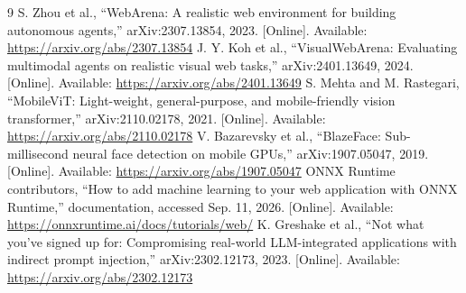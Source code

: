 \documentclass[conference]{IEEEtran}
\begin{document}
\begin{thebibliography}{9}
 S. Zhou et al., ``WebArena: A realistic web environment for building autonomous agents,'' arXiv:2307.13854, 2023. [Online]. Available: \url{https://arxiv.org/abs/2307.13854}
 J. Y. Koh et al., ``VisualWebArena: Evaluating multimodal agents on realistic visual web tasks,'' arXiv:2401.13649, 2024. [Online]. Available: \url{https://arxiv.org/abs/2401.13649}
 S. Mehta and M. Rastegari, ``MobileViT: Light-weight, general-purpose, and mobile-friendly vision transformer,'' arXiv:2110.02178, 2021. [Online]. Available: \url{https://arxiv.org/abs/2110.02178}
 V. Bazarevsky et al., ``BlazeFace: Sub-millisecond neural face detection on mobile GPUs,'' arXiv:1907.05047, 2019. [Online]. Available: \url{https://arxiv.org/abs/1907.05047}
 ONNX Runtime contributors, ``How to add machine learning to your web application with ONNX Runtime,'' documentation, accessed Sep. 11, 2026. [Online]. Available: \url{https://onnxruntime.ai/docs/tutorials/web/}
 K. Greshake et al., ``Not what you've signed up for: Compromising real-world LLM-integrated applications with indirect prompt injection,'' arXiv:2302.12173, 2023. [Online]. Available: \url{https://arxiv.org/abs/2302.12173}
\end{thebibliography}
\end{document}
